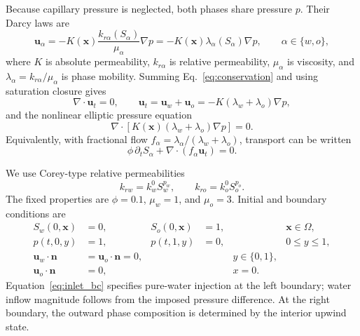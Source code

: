 Because capillary pressure is neglected, both phases share pressure \(p\). Their Darcy laws are
\begin{equation}
    \boldsymbol u_\alpha
    =-K(\boldsymbol x)\frac{k_{r\alpha}(S_\alpha)}{\mu_\alpha}\nabla p
    =-K(\boldsymbol x)\lambda_\alpha(S_\alpha)\nabla p,
    \qquad \alpha\in\{w,o\},
    \label{eq:darcy}
\end{equation}
where \(K\) is absolute permeability, \(k_{r\alpha}\) is relative permeability, \(\mu_\alpha\) is viscosity, and \(\lambda_\alpha=k_{r\alpha}/\mu_\alpha\) is phase mobility. Summing Eq.~\eqref{eq:conservation} and using saturation closure gives
\begin{equation}
    \nabla\cdot\boldsymbol u_t=0,
    \qquad
    \boldsymbol u_t=\boldsymbol u_w+\boldsymbol u_o
    =-K(\lambda_w+\lambda_o)\nabla p,
    \label{eq:total_flux}
\end{equation}
and the nonlinear elliptic pressure equation
\begin{equation}
    \nabla\cdot\left[K(\boldsymbol x)
    (\lambda_w+\lambda_o)\nabla p\right]=0.
    \label{eq:pressure_equation}
\end{equation}
Equivalently, with fractional flow \(f_\alpha=\lambda_\alpha/(\lambda_w+\lambda_o)\), transport can be written
\begin{equation}
    \phi\,\partial_t S_\alpha
    +\nabla\cdot(f_\alpha\boldsymbol u_t)=0.
    \label{eq:fractional_flow}
\end{equation}

We use Corey-type relative permeabilities \cite{corey1954interrelation}
\begin{equation}
    k_{rw}=k_w^0 S_w^{p_w},
    \qquad
    k_{ro}=k_o^0 S_o^{p_o}.
    \label{eq:corey}
\end{equation}
The fixed properties are \(\phi=0.1\), \(\mu_w=1\), and \(\mu_o=3\). Initial and boundary conditions are
\begin{align}
    S_w(0,\boldsymbol x)&=0, & S_o(0,\boldsymbol x)&=1,
    &&\boldsymbol x\in\Omega,\label{eq:flow_ic}\\
    p(t,0,y)&=1, &p(t,1,y)&=0,
    &&0\le y\le1,\label{eq:pressure_bc}\\
    \boldsymbol u_w\cdot\boldsymbol n
    &=\boldsymbol u_o\cdot\boldsymbol n=0,
    &&&y\in\{0,1\},\label{eq:noflow_bc}\\
    \boldsymbol u_o\cdot\boldsymbol n&=0,
    &&&x=0.\label{eq:inlet_bc}
\end{align}
Equation~\eqref{eq:inlet_bc} specifies pure-water injection at the left boundary; water inflow magnitude follows from the imposed pressure difference. At the right boundary, the outward phase composition is determined by the interior upwind state.

